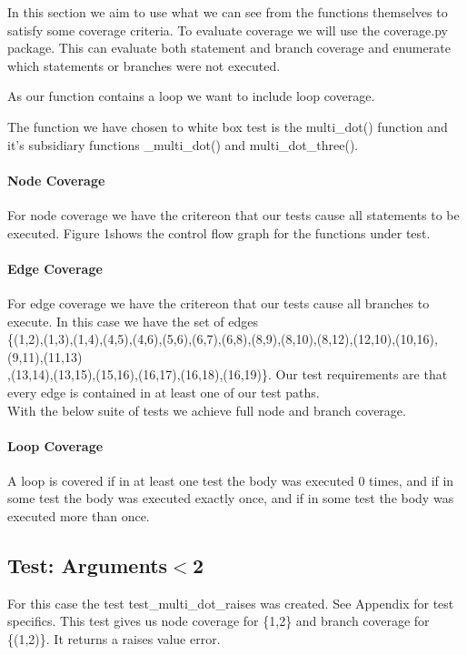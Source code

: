 In this section we aim to use what we can see from the functions themselves to satisfy some coverage
criteria. To evaluate coverage we will use the coverage.py package. This can evaluate both statement and branch coverage and enumerate which statements or branches were not executed.

As our function contains a loop we want to include loop coverage. 

The function we have chosen to white box test is the multi\_dot() function and it's subsidiary functions \_multi\_dot() and multi\_dot\_three().





\paragraph{Node Coverage}


For node coverage we have the critereon that our tests cause all statements to be executed. Figure 1shows the control flow graph for the functions under test. 



\paragraph{Edge Coverage}

For edge coverage we have the critereon that our tests cause all branches to execute. In this case we have the set of edges \\
\{(1,2),(1,3),(1,4),(4,5),(4,6),(5,6),(6,7),(6,8),(8,9),(8,10),(8,12),(12,10),(10,16),(9,11),(11,13)\\
,(13,14),(13,15),(15,16),(16,17),(16,18),(16,19)\}.
Our test requirements are that every edge is contained in at least one of our test paths.
\\
With the below suite of tests we achieve full node and branch coverage.

\paragraph{Loop Coverage}

A loop is covered if in at least one test the body was executed 0 times, and if in some test the body was executed exactly once, and if in some test the body was executed more than once.




\subsection{Test: Arguments$<$2}
For this case the test test\_multi\_dot\_raises was created. See Appendix for test specifics.
This test gives us node coverage for \{1,2\} and branch coverage for \{(1,2)\}. It returns a raises value error.

